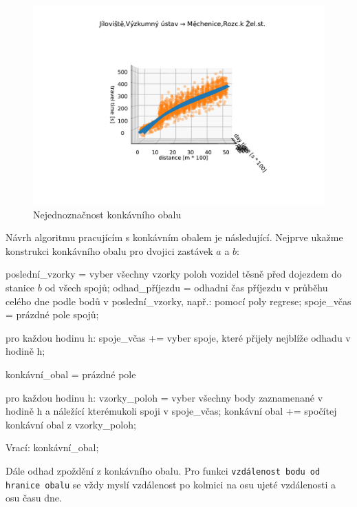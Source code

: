 \begin{figure}
\centering
  \includegraphics[width=1\linewidth]{../img/good_to_concave_hull}
  \caption{Nejednoznačnost konkávního obalu}
  \label{fig:good_to_concave_hull}
\end{figure}


\bigbreak


Návrh algoritmu pracujícím s konkávním obalem je následující. Nejprve ukažme konstrukci konkávního obalu pro dvojici zastávek $a$ a $b$:


\begin{code}[frame=none]
poslední_vzorky = vyber všechny vzorky poloh vozidel
  těsně před dojezdem do stanice $b$ od všech spojů;
odhad_příjezdu = odhadni čas příjezdu v průběhu celého
  dne podle bodů v poslední_vzorky, např.: pomocí poly regrese;
spoje_včas = prázdné pole spojů;


pro každou hodinu h:
  spoje_včas += vyber spoje, které přijely nejblíže
    odhadu v hodině h;


konkávní_obal = prázdné pole


pro každou hodinu h:
  vzorky_poloh = vyber všechny body zaznamenané
    v hodině h a náležící kterémukoli spoji v spoje_včas;
  konkávní obal += spočítej konkávní obal z vzorky_poloh;


Vrací: konkávní_obal;
\end{code}


Dále odhad zpoždění z konkávního obalu. Pro funkci \verb-vzdálenost bodu od hranice obalu- se vždy myslí vzdálenost po kolmici na osu ujeté vzdálenosti a osu času dne.


